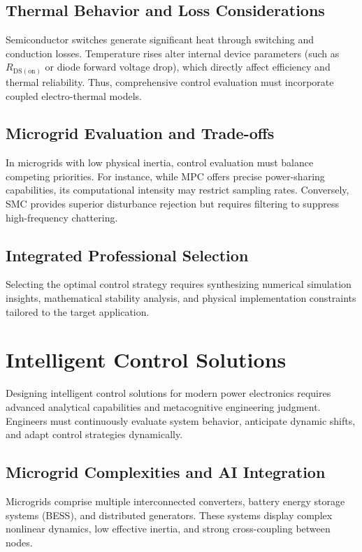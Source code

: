 \documentclass[12pt,a4paper]{article}
\begin{document}
\subsection{Thermal Behavior and Loss Considerations}
Semiconductor switches generate significant heat through switching and conduction losses. Temperature rises alter internal device parameters (such as $R_{\mathrm{DS(on)}}$ or diode forward voltage drop), which directly affect efficiency and thermal reliability. Thus, comprehensive control evaluation must incorporate coupled electro-thermal models.

\subsection{Microgrid Evaluation and Trade-offs}
In microgrids with low physical inertia, control evaluation must balance competing priorities. For instance, while MPC offers precise power-sharing capabilities, its computational intensity may restrict sampling rates. Conversely, SMC provides superior disturbance rejection but requires filtering to suppress high-frequency chattering.

\subsection{Integrated Professional Selection}
Selecting the optimal control strategy requires synthesizing numerical simulation insights, mathematical stability analysis, and physical implementation constraints tailored to the target application.

\section{Intelligent Control Solutions}

Designing intelligent control solutions for modern power electronics requires advanced analytical capabilities and metacognitive engineering judgment. Engineers must continuously evaluate system behavior, anticipate dynamic shifts, and adapt control strategies dynamically.

\subsection{Microgrid Complexities and AI Integration}
Microgrids comprise multiple interconnected converters, battery energy storage systems (BESS), and distributed generators. These systems display complex nonlinear dynamics, low effective inertia, and strong cross-coupling between nodes.
\end{document}
